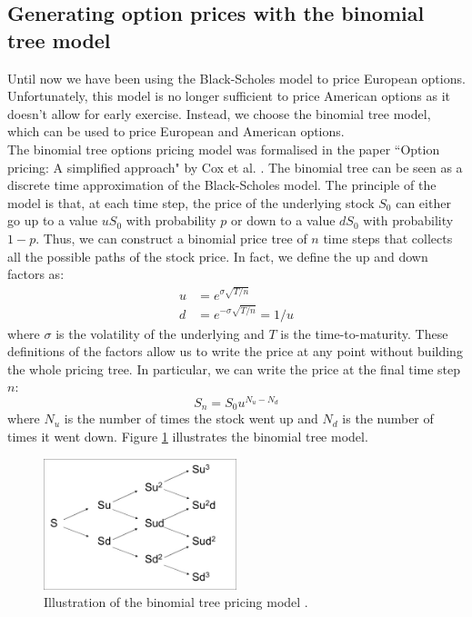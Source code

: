 \documentclass[a4paper,12pt]{article}
\begin{document}
\subsection{Generating option prices with the binomial tree model}
Until now we have been using the Black-Scholes model to price European options. Unfortunately, this model is no longer sufficient to price American options as it doesn't allow for early exercise. Instead, we choose the binomial tree model, which can be used to price European and American options.\\
The binomial tree options pricing model was formalised in the paper ``Option pricing: A simplified approach" by Cox et al. \cite{COX1979}. The binomial tree can be seen as a discrete time approximation of the Black-Scholes model. The principle of the model is that, at each time step, the price of the underlying stock $S_0$ can either go up to a value $u S_0$ with probability $p$ or down to a value $d S_0$ with probability $1-p$. Thus, we can construct a binomial price tree of $n$ time steps that collects all the possible paths of the stock price. In fact, we define the up and down factors as: 
\begin{align*}
    u &= e^{\sigma \sqrt{T/n}} \\
    d &= e^{-\sigma \sqrt{T/n}} = 1/u
\end{align*}
where $\sigma$ is the volatility of the underlying and $T$ is the time-to-maturity. These definitions of the factors allow us to write the price at any point without building the whole pricing tree. In particular, we can write the price at the final time step $n$:
$$S_n = S_0 u^{N_u - N_d}$$
where $N_u$ is the number of times the stock went up and $N_d$ is the number of times it went down. Figure \ref{fig:binomial_tree} illustrates the binomial tree model.
\begin{figure} [H]
    \centering
    \includegraphics[width=0.5\textwidth]{binomial_tree.png}
    \caption{Illustration of the binomial tree pricing model \cite{binomialtree}.}
    \label{fig:binomial_tree}
\end{figure}
\end{document}
